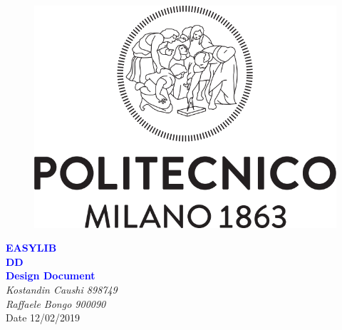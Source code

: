 


	\begin{titlepage}
		\centering
		\begin{figure}
			\vspace*{0mm}
			\centering
			\includegraphics[scale=0.3]{Images/Polimi_Logo}
			\\[3cm]
		\end{figure}		
		\vspace{65mm}
		\textcolor{Blue}{\textbf{\huge EASYLIB}}\\[15mm]
		\textcolor{Blue}{\textbf{\huge DD}}\\[4mm]
		{\textcolor{Blue}{\textbf{\Large{Design Document}}}}\\
		\vspace{30mm}
		\textit{\large Kostandin Caushi 898749}\\[3mm]
		\textit{\large Raffaele Bongo 900090}\\[3mm]
		\vspace{30mm}
		Date 12/02/2019
	\end{titlepage}

	\begin{center}
	\vspace*{-5mm}
	\renewcommand{\contentsname}{Table of Contents}
	\tableofcontents
	\newpage
	\listoffigures
	\newpage
    \end{center}
	
	\ttfamily
	\setlength{\emergencystretch}{45pt}
	
	\newpage
	
	\newpage
	
	\newpage
	
	\newpage
	
	\newpage
	

